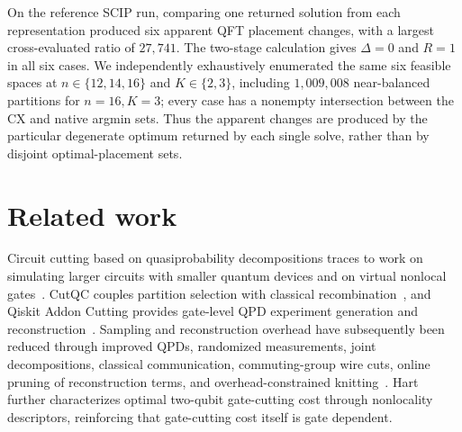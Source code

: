 \documentclass[
  aps,
  pra,
  reprint,
  amsmath,
  amssymb,
  longbibliography,
  nofootinbib,
  floatfix
]{revtex4-2}
\theoremstyle{plain}
\begin{document}
On the reference SCIP run, comparing one returned solution from each representation produced six apparent QFT placement changes, with a largest cross-evaluated ratio of $27{,}741$. The two-stage calculation gives $\Delta=0$ and $R=1$ in all six cases. We independently exhaustively enumerated the same six feasible spaces at $n\in\{12,14,16\}$ and $K\in\{2,3\}$, including $1{,}009{,}008$ near-balanced partitions for $n=16,K=3$; every case has a nonempty intersection between the CX and native argmin sets. Thus the apparent changes are produced by the particular degenerate optimum returned by each single solve, rather than by disjoint optimal-placement sets.

\section{Related work}
\label{sec:related}

Circuit cutting based on quasiprobability decompositions traces to work on simulating larger circuits with smaller quantum devices and on virtual nonlocal gates~\cite{peng2020,bravyi2016,mitarai2021,mitarai2021overhead}. CutQC couples partition selection with classical recombination~\cite{tang2021}, and Qiskit Addon Cutting provides gate-level QPD experiment generation and reconstruction~\cite{qiskitcutting}. Sampling and reconstruction overhead have subsequently been reduced through improved QPDs, randomized measurements, joint decompositions, classical communication, commuting-group wire cuts, online pruning of reconstruction terms, and overhead-constrained knitting~\cite{piveteau2022,lowe2023,ufrecht2023,ufrecht2024,schmitt2025,piveteau2024,piveteau2025sideinfo,brenner2025,li2024,golden2023,gentinetta2024,carrera2024,shotqc2024,harrowlowe2025}. Hart~\cite{hart2026} further characterizes optimal two-qubit gate-cutting cost through nonlocality descriptors, reinforcing that gate-cutting cost itself is gate dependent.
\end{document}
